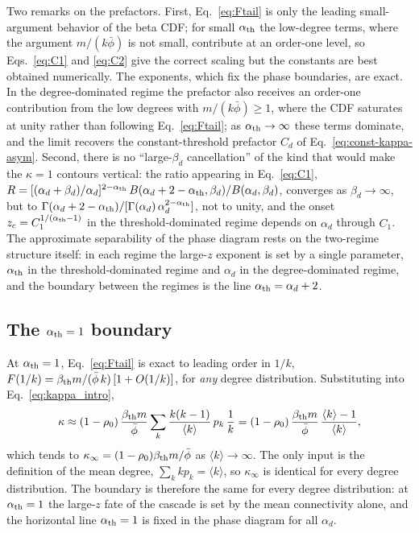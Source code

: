 \documentclass[]{revtex4-2}
\begin{document}
Two remarks on the prefactors. First, Eq.~\eqref{eq:Ftail} is only the leading small-argument behavior of the beta CDF; for small $\alpha_{\rm th}$ the low-degree terms, where the argument $m/(k\bar\phi)$ is not small, contribute at an order-one level, so Eqs.~\eqref{eq:C1} and \eqref{eq:C2} give the correct scaling but the constants are best obtained numerically. The exponents, which fix the phase boundaries, are exact. In the degree-dominated regime the prefactor also receives an order-one contribution from the low degrees with $m/(k\bar\phi)\ge1$, where the CDF saturates at unity rather than following Eq.~\eqref{eq:Ftail}; as $\alpha_{\rm th}\to\infty$ these terms dominate, and the limit recovers the constant-threshold prefactor $C_d$ of Eq.~\eqref{eq:const-kappa-asym}. Second, there is no ``large-$\beta_d$ cancellation'' of the kind that would make the $\kappa=1$ contours vertical: the ratio appearing in Eq.~\eqref{eq:C1}, $R = [(\alpha_d+\beta_d)/\alpha_d]^{2-\alpha_{\rm th}}\,B(\alpha_d+2-\alpha_{\rm th},\beta_d)/B(\alpha_d,\beta_d)$, converges as $\beta_d\to\infty$, but to $\Gamma(\alpha_d+2-\alpha_{\rm th})/[\Gamma(\alpha_d)\,\alpha_d^{2-\alpha_{\rm th}}]$, not to unity, and the onset $z_c = C_1^{1/(\alpha_{\rm th}-1)}$ in the threshold-dominated regime depends on $\alpha_d$ through $C_1$. The approximate separability of the phase diagram rests on the two-regime structure itself: in each regime the large-$z$ exponent is set by a single parameter, $\alpha_{\rm th}$ in the threshold-dominated regime and $\alpha_d$ in the degree-dominated regime, and the boundary between the regimes is the line $\alpha_{\rm th}=\alpha_d+2$.

\subsection{The $\alpha_{\rm th}=1$ boundary}

At $\alpha_{\rm th}=1$, Eq.~\eqref{eq:Ftail} is exact to leading order in $1/k$, $F(1/k) = \beta_{\rm th} m/(\bar\phi\,k)\,[1+O(1/k)]$, for \emph{any} degree distribution. Substituting into Eq.~\eqref{eq:kappa_intro},
\begin{equation}
    \kappa
    \approx (1-\rho_0)\,\frac{\beta_{\rm th} m}{\bar\phi}
    \sum_{k}\frac{k(k-1)}{\langle k\rangle}\,p_k\,\frac{1}{k}
    = (1-\rho_0)\,\frac{\beta_{\rm th} m}{\bar\phi}
    \,\frac{\langle k\rangle - 1}{\langle k\rangle},
\end{equation}
which tends to $\kappa_\infty = (1-\rho_0)\beta_{\rm th}m/\bar\phi$ as $\langle k\rangle\to\infty$. The only input is the definition of the mean degree, $\sum_k k p_k = \langle k\rangle$, so $\kappa_\infty$ is identical for every degree distribution. The boundary is therefore the same for every degree distribution: at $\alpha_{\rm th}=1$ the large-$z$ fate of the cascade is set by the mean connectivity alone, and the horizontal line $\alpha_{\rm th}=1$ is fixed in the phase diagram for all $\alpha_d$.


\end{document}
